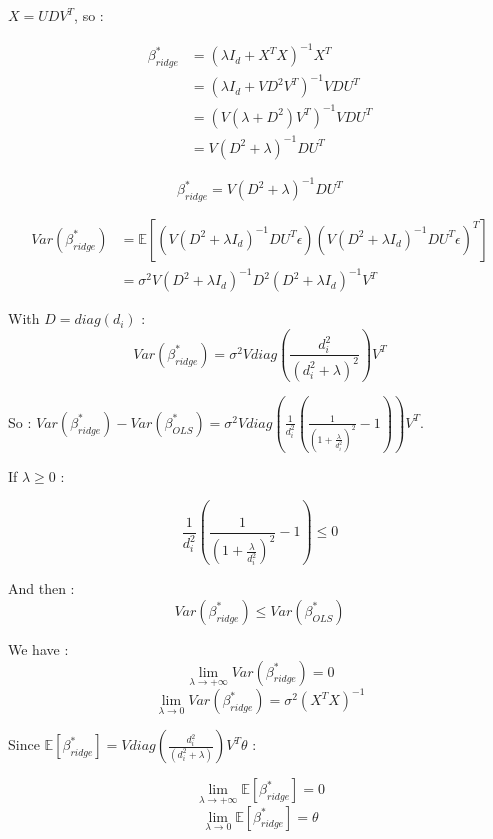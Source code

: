 \documentclass[12pt,a4paper]{article}
\begin{document}
$X = UDV^T$, so :

\begin{align} 
    \beta^*_{ridge} & = (\lambda I_d + X^TX)^{-1}X^T      \\
                    & = (\lambda I_d + VD^2V^T)^{-1}VDU^T \\
                    & = (V(\lambda +D^2)V^T)^{-1}VDU^T    \\    
                    & = V(D^2 + \lambda)^{-1}DU^T
\end{align}

$$ \boxed{ \beta^*_{ridge}= V(D^2 + \lambda)^{-1}DU^T} $$

\begin{align}
    Var(\beta^*_{ridge}) & = \mathbb{E}[(V(D^2 + \lambda I_d)^{-1}DU^T\epsilon)(V(D^2 + \lambda I_d)^{-1}DU^T\epsilon)^T] \\
                         & = \sigma^2V(D^2 + \lambda I_d)^{-1}D^2(D^2 + \lambda I_d)^{-1}V^T 
\end{align}

With $D = diag(d_i)$ : 
$$
    Var(\beta^*_{ridge}) = \sigma^2V diag(\frac{d_i^2}{(d_i^2 + \lambda)^2})V^T
$$

So : $ Var(\beta^*_{ridge}) -  Var(\beta^*_{OLS}) = \sigma^2Vdiag(\frac{1}{d_i^2}(\frac{1}{(1+ \frac{\lambda}{d_i^2})^2} - 1))V^T$.

If $ \lambda \geq 0 $ :  

$$
    \frac{1}{d_i^2}( \frac{1}{(1+ \frac{\lambda}{d_i^2})^2} - 1) \leq 0
$$

And then :
$$
    \boxed{Var(\beta^*_{ridge}) \leq  Var(\beta^*_{OLS})}
$$


We have :
$$
    \lim_{\lambda \to +\infty} Var(\beta^*_{ridge}) = 0 $$
$$
    \lim_{\lambda \to 0} Var(\beta^*_{ridge})  = \sigma^2(X^TX)^{-1}
$$

Since $ \mathbb{E}[\beta^*_{ridge}] =  V diag(\frac{d_i^2}{(d_i^2 + \lambda)})V^T\theta $ :

$$
    \boxed{\lim_{\lambda \to +\infty} \mathbb{E}[\beta^*_{ridge}] = 0} 
$$
$$
\boxed{\lim_{\lambda \to 0} \mathbb{E}[\beta^*_{ridge}] =  \theta}
$$
\end{document}
